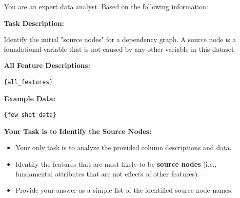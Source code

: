\begin{tcolorbox}[
    float*=t, width=\textwidth, floatplacement=htbp,
    colback=yellow!10!white,  %
    colframe=yellow!75!black, %
    title={Prompt for Source Nodes Initialization of Tabular Data ($\pi_\mathtt{source}$)}, %
    fonttitle=\bfseries\color{white}, %
    arc=2mm, %
    boxrule=1pt %
]
\small %

You are an expert data analyst. Based on the following information:

\vspace{\medskipamount}

\textbf{Task Description:}

Identify the initial "source nodes" for a dependency graph. A source node is a foundational variable that is not caused by any other variable in this dataset.


\vspace{\medskipamount}

\textbf{All Feature Descriptions:}
\begin{verbatim}
{all_features}
\end{verbatim}

\vspace{\medskipamount}

\textbf{Example Data:}
\begin{verbatim}
{few_shot_data}
\end{verbatim}

\vspace{\medskipamount}

\textbf{Your Task is to Identify the Source Nodes:}
\begin{itemize}[leftmargin=*, itemsep=2pt]
    \item Your only task is to analyze the provided column descriptions and data.
    \item Identify the features that are most likely to be \textbf{source nodes} (i.e., fundamental attributes that are not effects of other features).
    \item Provide your answer as a simple list of the identified source node names.
\end{itemize}
\label{prompt:source}
\end{tcolorbox}



